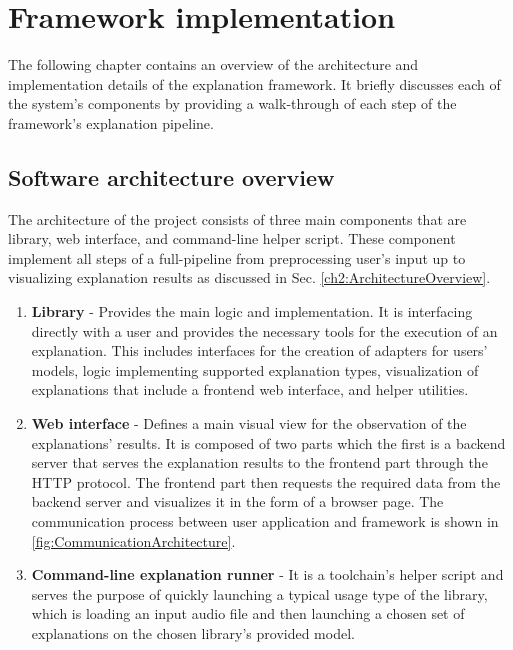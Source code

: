 \documentclass[
    bindingoffset=5mm,  %
    footnoteindent=3mm, %
    hyphenation=true    %
]{src/wut-thesis}
\begin{document}
%
%
\clearpage %
\section{Framework implementation} \label{ch:implementation}

    The following chapter contains an overview of the architecture and implementation details of
    the explanation framework. It briefly discusses each of the system's components by providing
    a walk-through of each step of the framework's explanation pipeline.

\subsection{Software architecture overview}

    The architecture of the project consists of three main components that are library, web interface, and command-line helper script.
    These component implement all steps of a full-pipeline from preprocessing
    user's input up to visualizing explanation results as discussed in Sec. \ref{ch2:ArchitectureOverview}.

\begin{enumerate}
    \item \textbf{Library} - Provides the main logic and implementation. It is interfacing directly with a user and
    provides the necessary tools for the execution of an explanation. This includes interfaces for the creation of 
    adapters for users' models, logic implementing supported explanation types, visualization of explanations that 
    include a frontend web interface, and helper utilities.

    \item \textbf{Web interface} - Defines a main visual view for the observation of the explanations' results. It is
    composed of two parts which the first is a backend server that serves the explanation results to the frontend part
    through the HTTP protocol. The frontend part then requests the required data from the backend server and visualizes
    it in the form of a browser page. The communication process between user application and framework is shown in
    \ref{fig:CommunicationArchitecture}.

    \item \textbf{Command-line explanation runner} - It is a toolchain's helper script and serves the purpose of quickly 
    launching a typical usage type of the library, which is loading an input audio file and then launching a chosen set 
    of explanations on the chosen library's provided model.
\end{enumerate}
\end{document}
